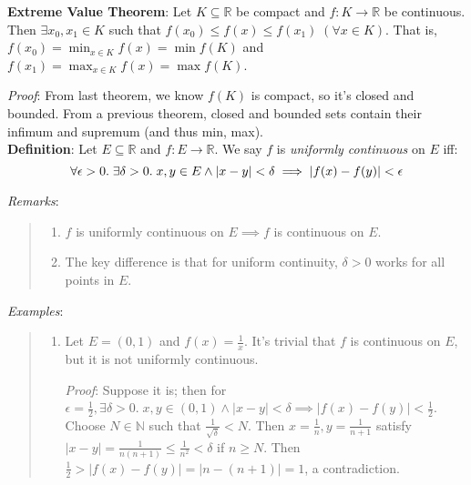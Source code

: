 \documentclass[11pt]{article}
\begin{document}
\textbf{Extreme Value Theorem}: Let $K \subseteq \mathbb{R}$ be compact and $f : K \to \mathbb{R}$ be continuous. Then $\exists x_0, x_1 \in K$ such that $f(x_0) \leq f(x) \leq f(x_1) \;(\forall x \in K)$. That is, $f(x_0) = \min_{x \in K} f(x) = \min f(K)$ and $f(x_1) = \max_{x \in K} f(x) = \max f(K)$.

\emph{Proof}: From last theorem, we know $f(K)$ is compact, so it's closed and bounded. From a previous theorem, closed and bounded sets contain their infimum and supremum (and thus min, max).\\

\textbf{Definition}: Let $E \subseteq \mathbb{R}$ and $f : E \to \mathbb{R}$. We say $f$ is \emph{uniformly continuous} on $E$ iff:
\begin{displaymath}\vspace{-0.3cm}
\forall \epsilon > 0.\; \exists \delta > 0.\; x, y \in E \land |x-y| < \delta \implies |f(x) - f(y)| < \epsilon
\end{displaymath}

\emph{Remarks}:
\begin{quote}\vspace{-0.3cm}
	\begin{enumerate}
	\item $f$ is uniformly continuous on $E \implies f$ is continuous on $E$.
	\item The key difference is that for uniform continuity, $\delta > 0$ works for all points in $E$.
	\end{enumerate}
\end{quote}

\emph{Examples}:

\begin{quote}\vspace{-0.3cm}
	\begin{enumerate}
	\item Let $E = (0,1)$ and $f(x) = \frac{1}{x}$. It's trivial that $f$ is continuous on $E$, but it is not uniformly continuous.

	\emph{Proof}: Suppose it is; then for $\epsilon = \frac{1}{2}, \exists \delta > 0.\; x,y \in (0,1) \land |x-y| < \delta \implies |f(x) - f(y)| < \frac{1}{2}$. Choose $N \in \mathbb{N}$ such that $\frac{1}{\sqrt{\delta}} < N$. Then $x = \frac{1}{n}, y = \frac{1}{n+1}$ satisfy $|x-y| = \frac{1}{n(n+1)} \leq \frac{1}{n^2} < \delta$ if $n \geq N$. Then $\frac{1}{2} > |f(x) - f(y)| = |n - (n+1)| = 1$, a contradiction.
	\end{enumerate}
\end{quote}
\end{document}
